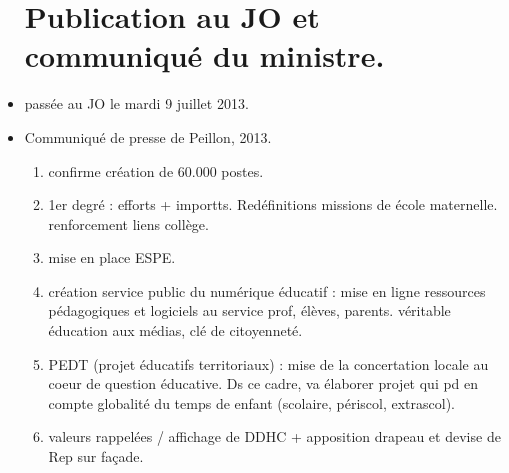 \documentclass[12pt]{report}
\begin{document}
\begin{itemize}
\section{Publication au JO et communiqué du ministre.}

\item passée au JO le mardi 9 juillet 2013. \\

\item Communiqué de presse de Peillon, 2013.
\begin{enumerate}
\item confirme création de 60.000 postes.\\
\item 1er degré : efforts + importts. Redéfinitions missions de école maternelle. renforcement liens collège.\\
 \item mise en place ESPE. \\
 \item création service public du numérique éducatif : mise en ligne ressources pédagogiques et logiciels au service prof, élèves, parents. véritable éducation aux médias, clé de citoyenneté.\\
 \item  PEDT (projet éducatifs territoriaux) : mise de la concertation locale au coeur de question éducative. Ds ce cadre, va élaborer projet qui pd en compte globalité du temps de enfant (scolaire, périscol, extrascol).\\
 \item valeurs rappelées / affichage de DDHC + apposition drapeau et devise de Rep sur façade.
\end{enumerate}


\end{itemize}
\end{document}
